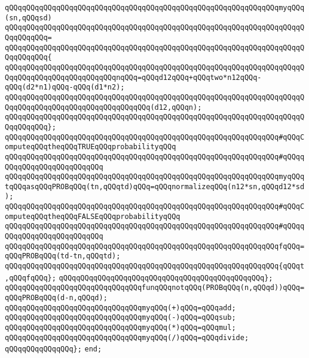 \newline
\verb|qQQqqQQqqQQqqQQqqQQqqQQqqQQqqQQqqQQqqQQqqQQqqQQqqQQqqQQqqQQqqQQqmyqQQq(sn,qQQqsd)|\newline
\verb|qQQqqQQqqQQqqQQqqQQqqQQqqQQqqQQqqQQqqQQqqQQqqQQqqQQqqQQqqQQqqQQqqQQqqQQqqQQqqQQq=|\newline
\verb|qQQqqQQqqQQqqQQqqQQqqQQqqQQqqQQqqQQqqQQqqQQqqQQqqQQqqQQqqQQqqQQqqQQqqQQqqQQqqQQq{|\newline
\verb|qQQqqQQqqQQqqQQqqQQqqQQqqQQqqQQqqQQqqQQqqQQqqQQqqQQqqQQqqQQqqQQqqQQqqQQqqQQqqQQqqQQqqQQqqQQqqQQqnqQQq=qQQqd12qQQq+qQQqtwo*n12qQQq-qQQq(d2*n1)qQQq-qQQq(d1*n2);|\newline
\newline
\verb|qQQqqQQqqQQqqQQqqQQqqQQqqQQqqQQqqQQqqQQqqQQqqQQqqQQqqQQqqQQqqQQqqQQqqQQqqQQqqQQqqQQqqQQqqQQqqQQqqQQqqQQq(d12,qQQqn);|\newline
\verb|qQQqqQQqqQQqqQQqqQQqqQQqqQQqqQQqqQQqqQQqqQQqqQQqqQQqqQQqqQQqqQQqqQQqqQQqqQQqqQQq};|\newline
\newline
\verb|qQQqqQQqqQQqqQQqqQQqqQQqqQQqqQQqqQQqqQQqqQQqqQQqqQQqqQQqqQQqqQQq#qQQqComputeqQQqtheqQQqTRUEqQQqprobabilityqQQq|\newline
\verb|qQQqqQQqqQQqqQQqqQQqqQQqqQQqqQQqqQQqqQQqqQQqqQQqqQQqqQQqqQQqqQQq#qQQqqQQqqQQqqQQqqQQqqQQqqQQq|\newline
\verb|qQQqqQQqqQQqqQQqqQQqqQQqqQQqqQQqqQQqqQQqqQQqqQQqqQQqqQQqqQQqqQQqmyqQQqtqQQqasqQQqPROBqQQq(tn,qQQqtd)qQQq=qQQqnormalizeqQQq(n12*sn,qQQqd12*sd);|\newline
\newline
\verb|qQQqqQQqqQQqqQQqqQQqqQQqqQQqqQQqqQQqqQQqqQQqqQQqqQQqqQQqqQQqqQQq#qQQqComputeqQQqtheqQQqFALSEqQQqprobabilityqQQq|\newline
\verb|qQQqqQQqqQQqqQQqqQQqqQQqqQQqqQQqqQQqqQQqqQQqqQQqqQQqqQQqqQQqqQQq#qQQqqQQqqQQqqQQqqQQqqQQqqQQq|\newline
\verb|qQQqqQQqqQQqqQQqqQQqqQQqqQQqqQQqqQQqqQQqqQQqqQQqqQQqqQQqqQQqqQQqfqQQq=qQQqPROBqQQq(td-tn,qQQqtd);|\newline
\newline
\verb|qQQqqQQqqQQqqQQqqQQqqQQqqQQqqQQqqQQqqQQqqQQqqQQqqQQqqQQqqQQqqQQq{qQQqt,qQQqfqQQq};|\newline
\verb|qQQqqQQqqQQqqQQqqQQqqQQqqQQqqQQqqQQqqQQqqQQqqQQq};|\newline
\newline
\verb|qQQqqQQqqQQqqQQqqQQqqQQqqQQqqQQqfunqQQqnotqQQq(PROBqQQq(n,qQQqd))qQQq=qQQqPROBqQQq(d-n,qQQqd);|\newline
\newline
\verb|qQQqqQQqqQQqqQQqqQQqqQQqqQQqqQQqmyqQQq(+)qQQq=qQQqadd;|\newline
\verb|qQQqqQQqqQQqqQQqqQQqqQQqqQQqqQQqmyqQQq(-)qQQq=qQQqsub;|\newline
\verb|qQQqqQQqqQQqqQQqqQQqqQQqqQQqqQQqmyqQQq(*)qQQq=qQQqmul;|\newline
\verb|qQQqqQQqqQQqqQQqqQQqqQQqqQQqqQQqmyqQQq(/)qQQq=qQQqdivide;|\newline
\newline
\verb|qQQqqQQqqQQqqQQq};|\newline
\verb|end;|\newline
\newline

